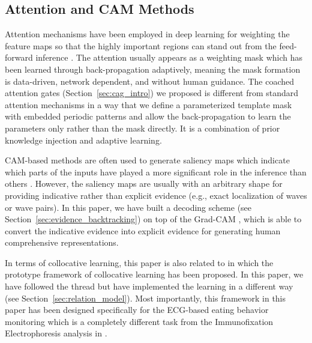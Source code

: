 	\subsection{Attention and CAM Methods}
	Attention mechanisms have been employed in deep learning for weighting the feature maps so that the highly important regions can stand out from the feed-forward inference \cite{hu2018squeeze,wang2018non,woo2018cbam}. The attention usually appears as a weighting mask which has been learned through back-propagation adaptively, meaning the mask formation is data-driven, network dependent, and without human guidance. The coached attention gates (Section~\ref{sec:cag_intro}) we proposed is different from standard attention mechanisms in a way that we define a parameterized template mask with embedded periodic patterns and allow the back-propagation to learn the parameters only rather than the mask directly. It is a combination of prior knowledge injection and adaptive learning.
	
	CAM-based methods are often used to generate saliency maps which indicate which parts of the inputs have played a more significant role in the inference than others \cite{chattopadhay2018grad,selvaraju2017grad,zhou2016learning}. However, the saliency maps are usually with an arbitrary shape for providing indicative rather than explicit evidence (e.g., exact localization of waves or wave pairs). In this paper, we have built a decoding scheme (see Section~\ref{sec:evidence_backtracking}) on top of the Grad-CAM \cite{selvaraju2017grad}, which is able to convert the indicative evidence into explicit evidence for generating human comprehensive representations.
	
	In terms of collocative learning, this paper is also related to \cite{wei2021deep} in which the prototype framework of collocative learning has been proposed. In this paper, we have followed the thread but have implemented the learning in a different way (see Section~\ref{sec:relation_model}). Most importantly, this framework in this paper has been designed specifically for the ECG-based eating behavior monitoring which is a completely different task from the Immunofixation Electrophoresis analysis in \cite{wei2021deep}.
	
